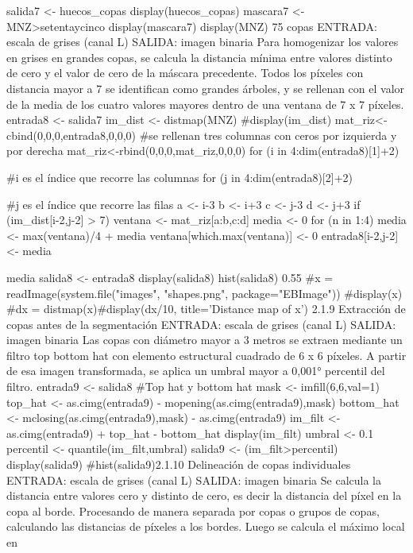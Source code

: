 salida7 <- huecos_copas
display(huecos_copas)
mascara7 <- MNZ>setentaycinco
display(mascara7)
display(MNZ)
75%
copas
ENTRADA: escala de grises (canal L)
SALIDA: imagen binaria
Para homogenizar los valores en grises en grandes copas, se calcula la distancia mínima
entre valores distinto de cero y el valor de cero de la máscara precedente. Todos los
píxeles con distancia mayor a 7 se identifican como grandes árboles, y se rellenan con el
valor de la media de los cuatro valores mayores dentro de una ventana de 7 x 7 píxeles.
entrada8 <- salida7
im_dist <- distmap(MNZ)
#display(im_dist)
mat_riz<-cbind(0,0,0,entrada8,0,0,0) #se rellenan tres columnas con ceros por izquierda
y por derecha
mat_riz<-rbind(0,0,0,mat_riz,0,0,0)
for (i in 4:dim(entrada8)[1]+2) { #i es el índice que recorre las columnas
  for (j in 4:dim(entrada8)[2]+2) { #j es el índice que recorre las filas
      a <- i-3
      b <- i+3      c <- j-3
      d <- j+3
      if (im_dist[i-2,j-2] > 7) {
           ventana <- mat_riz[a:b,c:d]
      media <- 0
      for (n in 1:4) {
          media <- max(ventana)/4 + media
          ventana[which.max(ventana)] <- 0
      }
      entrada8[i-2,j-2] <- media
      }
         
    
  }
 
}
media
salida8 <- entrada8
display(salida8)
hist(salida8)
0.55
#x = readImage(system.file("images", "shapes.png", package="EBImage"))
#display(x)
#dx = distmap(x)#display(dx/10, title='Distance map of x')
2.1.9 Extracción de copas antes de la segmentación
ENTRADA: escala de grises (canal L)
SALIDA: imagen binaria
Las copas con diámetro mayor a 3 metros se extraen mediante un filtro top bottom hat
con elemento estructural cuadrado de 6 x 6 píxeles. A partir de esa imagen
transformada, se aplica un umbral mayor a 0,001° percentil del filtro.
entrada9 <- salida8
#Top hat y bottom hat
mask <- imfill(6,6,val=1)
top_hat <- as.cimg(entrada9) - mopening(as.cimg(entrada9),mask)
bottom_hat <-  mclosing(as.cimg(entrada9),mask) - as.cimg(entrada9)
im_filt <- as.cimg(entrada9) + top_hat - bottom_hat
display(im_filt)
umbral <- 0.1
percentil <- quantile(im_filt,umbral)
salida9 <- (im_filt>percentil)
display(salida9)
#hist(salida9)2.1.10 Delineación de copas individuales
ENTRADA: escala de grises (canal L)
SALIDA: imagen binaria
Se calcula la distancia entre valores cero y distinto de cero, es decir la distancia del
píxel en la copa al borde. Procesando de manera separada por copas o grupos de copas,
calculando las distancias de píxeles a los bordes. Luego se calcula el máximo local en
